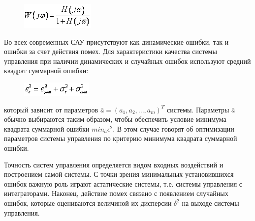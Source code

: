 \documentclass[14pt,a4paper,report]{report}
\begin{document}
\begin{figure}[h!]
	\centering
	\includegraphics[scale = 0.90]{images/17.png}
	\label{image:17}
\end{figure}

Во всех современных САУ присутствуют как динамические ошибки, так и ошибки за счет действия помех. Для характеристики качества системы управления при наличии динамических и случайных ошибок используют средний квадрат суммарной ошибки: 

\begin{figure}[h!]
	\centering
	\includegraphics[scale = 0.90]{images/18.png}
	\label{image:18}
\end{figure}

который зависит от параметров $\bar{a}=(a_1, a_2, ..., a_m)^T$ системы. Параметры $\bar{a}$ обычно выбираются таким образом, чтобы обеспечить условие минимума квадрата суммарной ошибки $min_{\bar{a}}\epsilon^2$. В этом случае говорят об оптимизации параметров системы управления по критерию минимума квадрата суммарной ошибки.

Точность систем управления определяется видом входных воздействий и построением самой системы. С точки зрения минимальных установившихся ошибок важную роль играют астатические системы, т.е. системы управления с интеграторами. Наконец, действие помех связано с появлением случайных ошибок, которые оцениваются величиной их дисперсии $\delta^2$ на выходе системы управления.
\end{document}
